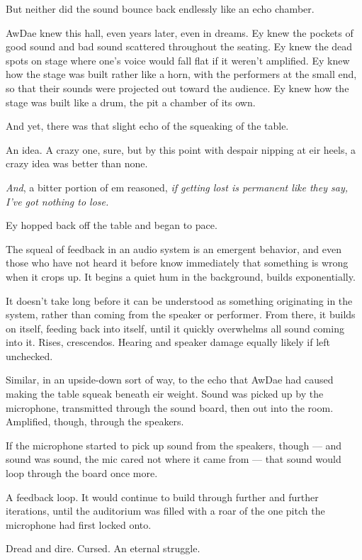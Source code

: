 But neither did the sound bounce back endlessly like an echo chamber.

AwDae knew this hall, even years later, even in dreams. Ey knew the pockets of good sound and bad sound scattered throughout the seating. Ey knew the dead spots on stage where one's voice would fall flat if it weren't amplified. Ey knew how the stage was built rather like a horn, with the performers at the small end, so that their sounds were projected out toward the audience. Ey knew how the stage was built like a drum, the pit a chamber of its own.

And yet, there was that slight echo of the squeaking of the table.

An idea. A crazy one, sure, but by this point with despair nipping at eir heels, a crazy idea was better than none.

\emph{And}, a bitter portion of em reasoned, \emph{if getting lost is permanent like they say, I've got nothing to lose.}

Ey hopped back off the table and began to pace.

The squeal of feedback in an audio system is an emergent behavior, and even those who have not heard it before know immediately that something is wrong when it crops up. It begins a quiet hum in the background, builds exponentially.

It doesn't take long before it can be understood as something originating in the system, rather than coming from the speaker or performer. From there, it builds on itself, feeding back into itself, until it quickly overwhelms all sound coming into it. Rises, crescendos. Hearing and speaker damage equally likely if left unchecked.

Similar, in an upside-down sort of way, to the echo that AwDae had caused making the table squeak beneath eir weight. Sound was picked up by the microphone, transmitted through the sound board, then out into the room. Amplified, though, through the speakers.

If the microphone started to pick up sound from the speakers, though — and sound was sound, the mic cared not where it came from — that sound would loop through the board once more.

A feedback loop. It would continue to build through further and further iterations, until the auditorium was filled with a roar of the one pitch the microphone had first locked onto.

Dread and dire. Cursed. An eternal struggle.

